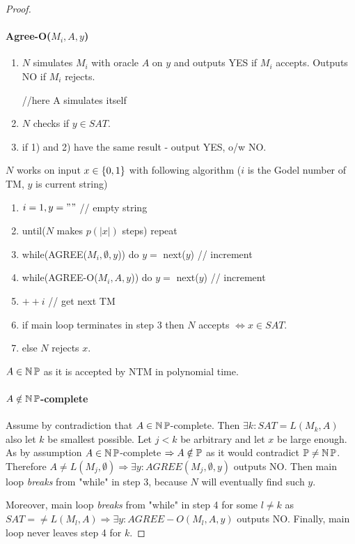 \begin{proof}
	\paragraph{Agree-O($M_i, A, y$)}
	\begin{enumerate}
		\item $N$ simulates $M_i$ with oracle $A$ on $y$ and outputs YES if $M_i$ accepts.
			Outputs NO if $M_i$ rejects.

		//here A simulates itself
		\item $N$ checks if $y \in SAT$.
		\item if 1) and 2) have the same result - output YES, o/w NO.
	\end{enumerate}
	$N$ works on input $x \in \operatorname{\{ 0, 1 \}}$ with following algorithm ($i$ is the Godel number of TM, $y$ is current string)
	\begin{enumerate}
		\item $i = 1, y = ""$ // empty string
		\item until($N$ makes $p(|x|)$ steps) repeat
		\item \tab while(AGREE($M_i, \emptyset, y$)) do $y = $ next($y$) // increment
		\item \tab while(AGREE-O($M_i, A, y$)) do $y = $ next($y$) // increment
		\item \tab $++i$ // get next TM
		\item if main loop terminates in step 3 then $N$ accepts $\iff x \in SAT$.
		\item else $N$ rejects $x$.
	\end{enumerate}

	$A \in \operatorname{\operatorname{\mathbb{N}}\mathbb{P}}$ as it is accepted by NTM in polynomial time.

	\paragraph{$A \notin \operatorname{\operatorname{\mathbb{N}}\mathbb{P}}$-complete} Assume by contradiction that $A \in \operatorname{\operatorname{\mathbb{N}}\mathbb{P}}$-complete.
	Then $\exists k: SAT = L(M_k, A)$ also let $k$ be smallest possible.
	Let $j < k$ be arbitrary and let $x$ be large enough.
	As by assumption $A \in \operatorname{\operatorname{\mathbb{N}}\mathbb{P}}$-complete $\Rightarrow A \notin \operatorname{\mathbb{P}}$ as it would contradict $\operatorname{\mathbb{P}} \ne \operatorname{\operatorname{\mathbb{N}}\mathbb{P}}$.
	Therefore $A \ne L(M_j, \emptyset) \Rightarrow \exists y: AGREE(M_j, \emptyset, y)$ outputs NO.
	Then main loop \emph{breaks} from "while" in step 3, because $N$ will eventually find such $y$.

	Moreover, main loop \emph{breaks} from "while" in step 4 for some $l \ne k$ as $SAT = \ne L(M_l, A) \Rightarrow \exists y: AGREE-O(M_l, A, y)$ outputs NO.
	Finally, main loop never leaves step 4 for $k$.


\end{proof}
